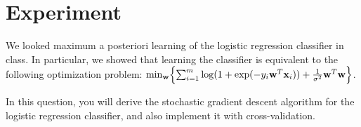 \section{Experiment}
\label{sec:experiment}

We looked maximum a posteriori learning of the logistic regression classifier in class. In particular, we showed that learning the classifier is equivalent to the following optimization problem: $\min_{{\bf w}} \Bigl\{\sum_{i=1}^m \log(1+ \exp(-y_i{\bf w}^T{\bf x}_i)) + \frac{1}{\sigma^2}{\bf w}^T{\bf w}\Bigr\}$.

In this question, you will derive the stochastic gradient descent algorithm for the logistic
regression classifier, and also implement it with cross-validation. 

